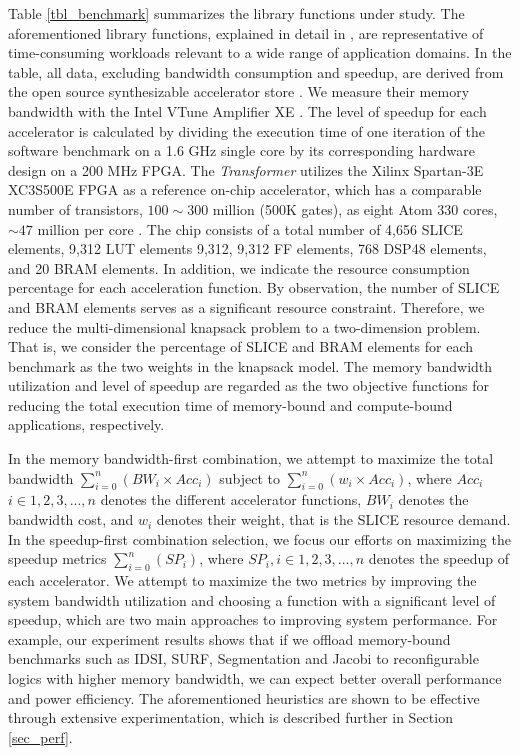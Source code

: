 Table \ref{tbl_benchmark} summarizes the library functions under
study. The aforementioned library functions, explained in detail in \cite{accstore}, are
representative of time-consuming workloads relevant to a wide range of application
domains.  In the table, all data, excluding bandwidth consumption and
speedup, are derived from the open source synthesizable accelerator
store \cite{accstore}. We measure their memory bandwidth with the Intel
VTune Amplifier XE \cite{vtune}. The level of speedup for each accelerator is
calculated by dividing the execution time of one iteration of the software
benchmark on a 1.6 GHz single core by its corresponding hardware design
on a 200 MHz FPGA. The {\em Transformer} utilizes the Xilinx Spartan-3E XC3S500E
FPGA \cite{spartan3e} as a reference on-chip accelerator, which has a
comparable number of transistors, {$100\sim300$ million (500K gates)},
as eight Atom 330 cores, {$\sim 47$ million per core}
\cite{atom-spec}. The chip consists of a total number of 4,656 SLICE elements, 9,312 LUT elements
9,312, 9,312 FF elements, 768 DSP48 elements, and 20 BRAM elements. In addition, we indicate the
resource consumption percentage for each acceleration function. By
observation, the number of SLICE and BRAM elements serves as a significant
resource constraint. Therefore, we reduce the multi-dimensional
knapsack problem to a two-dimension problem. That is, we consider the
percentage of SLICE and BRAM elements for each benchmark as the two weights in
the knapsack model. The memory bandwidth utilization and level of speedup are
regarded as the two objective functions for reducing the total execution
time of memory-bound and compute-bound applications, respectively.

In the memory bandwidth-first combination, we attempt to maximize the
total bandwidth $\sum_{i=0}^{n}(BW_i \times Acc_i) $ subject to
$\sum_{i=0}^{n}(w_i \times Acc_i) $, where $Acc_i$ $i \in {1,2,3,
  ... ,n}$ denotes the different accelerator functions, $BW_i$ denotes the
bandwidth cost, and $w_i$ denotes their weight, that is the SLICE resource
demand. In the speedup-first combination selection, we focus our
efforts on maximizing the speedup metrics $\sum_{i=0}^{n}(SP_i) $, where
$SP_i , i \in {1,2,3, \ldots, n}$ denotes the speedup of each
accelerator. We attempt to maximize the two metrics by improving
the system bandwidth utilization and choosing a function with
 a significant level of speedup, which are two main approaches to improving system
performance. For example, our experiment results shows that if we
offload memory-bound benchmarks such as IDSI, SURF, Segmentation and
Jacobi to reconfigurable logics with higher memory bandwidth, we can
expect better overall performance and power efficiency. The aforementioned
heuristics are shown to be effective through extensive experimentation, which is
described further in Section \ref{sec_perf}.

